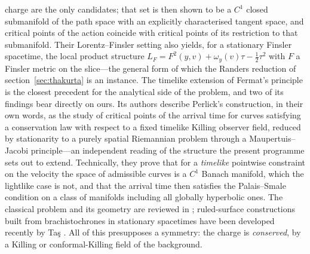 \documentclass[12pt]{iopart}
\theoremstyle{plain}
\theoremstyle{definition}
\theoremstyle{remark}
\begin{document}
charge are the only candidates; that set is then shown to be a $C^1$ closed submanifold
of the path space with an explicitly characterised tangent space, and critical points of
the action coincide with critical points of its restriction to that submanifold. Their
Lorentz--Finsler setting also yields, for a stationary Finsler spacetime, the local
product structure $L_F=F^2(y,v)+\omega_y(v)\tau-\tfrac12\tau^2$ with $F$ a Finsler metric
on the slice---the general form of which the Randers reduction of
section~\ref{sec:thakurta} is an instance. The timelike extension of Fermat's principle
\cite{GiannoniMasielloPiccione1998} is the closest precedent for the analytical side of
the problem, and two of its findings bear directly on ours. Its authors describe Perlick's
construction, in their own words, as the study of critical points of the arrival time for
curves satisfying a conservation law with respect to a fixed timelike Killing observer
field, reduced by stationarity to a purely spatial Riemannian problem through a
Maupertuis--Jacobi principle---an independent reading of the structure the present
programme sets out to extend. Technically, they prove that for a \emph{timelike} pointwise
constraint on the velocity the space of admissible curves is a $C^1$ Banach manifold,
which the lightlike case is not, and that the arrival time then satisfies the
Palais--Smale condition on a class of manifolds including all globally hyperbolic ones.
The classical
problem and its geometry are reviewed in \cite{HawsKiser1995}; ruled-surface constructions
built from brachistochrones in stationary spacetimes have been developed recently by
Ta\c{s} \cite{Tas2025}. All of this presupposes a symmetry: the charge is \emph{conserved},
by a Killing or conformal-Killing field of the background.
\end{document}
